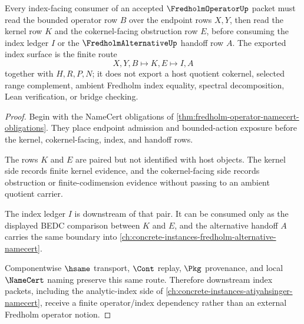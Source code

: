 \begin{theorem}
\label{thm:fredholm-operator-index-kernel-cokernel-handoff}
Every index-facing consumer of an accepted $\FredholmOperatorUp$ packet must read the bounded operator row $B$ over the endpoint rows $X,Y$, then read the kernel row $K$ and the cokernel-facing obstruction row $E$, before consuming the index ledger $I$ or the $\FredholmAlternativeUp$ handoff row $A$. The exported index surface is the finite route
$$
X,Y,B \longmapsto K,E \longmapsto I,A
$$
together with $H,R,P,N$; it does not export a host quotient cokernel, selected range complement, ambient Fredholm index equality, spectral decomposition, Lean verification, or bridge checking.
\end{theorem}
\begin{proof}
Begin with the NameCert obligations of \autoref{thm:fredholm-operator-namecert-obligations}. They place endpoint admission and bounded-action exposure before the kernel, cokernel-facing, index, and handoff rows.

The rows $K$ and $E$ are paired but not identified with host objects. The kernel side records finite kernel evidence, and the cokernel-facing side records obstruction or finite-codimension evidence without passing to an ambient quotient carrier.

The index ledger $I$ is downstream of that pair. It can be consumed only as the displayed BEDC comparison between $K$ and $E$, and the alternative handoff $A$ carries the same boundary into \autoref{ch:concrete-instances-fredholm-alternative-namecert}.

Componentwise $\hsame$ transport, $\Cont$ replay, $\Pkg$ provenance, and local $\NameCert$ naming preserve this same route. Therefore downstream index packets, including the analytic-index side of \autoref{ch:concrete-instances-atiyahsinger-namecert}, receive a finite operator/index dependency rather than an external Fredholm operator notion.
\end{proof}



